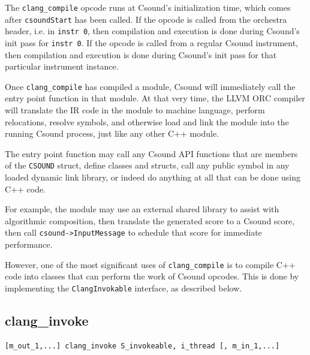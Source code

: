 \documentclass[letterpaper, 12pt]{article}
\begin{document}
The \verb|clang_compile| opcode runs at Csound's initialization time, which 
comes after \verb|csoundStart| has been called. If the opcode is called from the 
orchestra header, i.e. in \verb|instr 0|, then compilation and execution is done during Csound's init pass for \verb|instr 0|. If the opcode is called from a regular Csound 
instrument, then compilation and execution is done during Csound's init pass for that particular instrument instance.

Once \verb|clang_compile| has compiled a module, Csound will immediately 
call the entry point function in that module. At that very time, the LLVM ORC 
compiler will translate the IR code in the module to machine language, perform 
relocations, resolve symbols, and otherwise load and link the module into the 
running Csound process, just like any other C++ module.

The entry point function may call any Csound API functions that are members of 
the \verb|CSOUND| struct, define classes and structs, call any public symbol in any 
loaded dynamic link library, or indeed do anything at all that can be done 
using C++ code.

For example, the module may use an external shared library to assist with 
algorithmic composition, then translate the generated score to a Csound score, 
then call \verb|csound->InputMessage| to schedule that score for immediate 
performance.

However, one of the most significant uses of \verb|clang_compile| is to compile C++
code into classes that can perform the work of Csound opcodes. This is 
done by implementing the \verb|ClangInvokable| interface, as described below.

\subsection{clang\_invoke}

\begin{Verbatim}[fontfamily=courier, xleftmargin=\parindent]
[m_out_1,...] clang_invoke S_invokeable, i_thread [, m_in_1,...]
\end{Verbatim}
\end{document}
